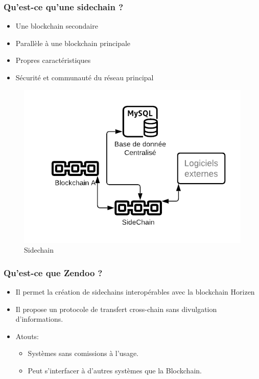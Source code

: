 \begin{frame} 
  \frametitle{Qu’est-ce qu’une sidechain ?} 
  \begin{itemize} 
    \item Une blockchain secondaire 
    \item Parallèle à une blockchain principale 
    \item Propres caractéristiques 
    \item Sécurité et communauté du réseau principal 
  \end{itemize} 

  \begin{figure}
    \centering
    \includegraphics[scale = 0.4]{decentralisation/sidechain.png}
    \caption{Sidechain}
  \end{figure}
\end{frame}

\begin{frame} 
  \frametitle{Qu’est-ce que Zendoo ?} 
  \begin{itemize} 
    \item Il permet la création de sidechains interopérables avec la blockchain Horizen 
    \item Il propose un protocole de transfert cross-chain sans divulgation d'informations. 
    \item Atouts:
    \begin{itemize}
      \item Systèmes sans comissions à l'usage.
      \item Peut s'interfacer à d'autres systèmes que la Blockchain.
    \end{itemize}
  \end{itemize} 
\end{frame}

